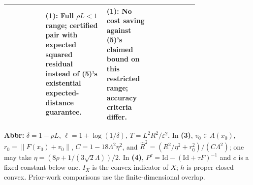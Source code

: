\begin{table}[tp]
\begin{threeparttable}
\begin{tabularx}{\linewidth}{@{}>{\raggedright\arraybackslash}p{0.20\linewidth}>{\raggedright\arraybackslash}p{0.32\linewidth}>{\raggedright\arraybackslash}p{0.25\linewidth}>{\raggedright\arraybackslash}X@{}}
& \textbf{(1)}: Full $\rho L<1$ range; certified pair with expected squared residual instead of \textbf{(5)}'s existential expected-distance guarantee.
& \textbf{(1)}: No cost saving against \textbf{(5)}'s claimed bound on this restricted range; accuracy criteria differ. \\
\bottomrule
\end{tabularx}
\begin{tablenotes}[flushleft]\footnotesize
\item[] \textbf{Abbr:} $\delta=1-\rho L$, $\ell=1+\log(1/\delta)$, $T=L^2R^2/\varepsilon^2$. In \textbf{(3)}, $v_0\in A(x_0)$, $r_0=\|F(x_0)+v_0\|$, $C=1-18\Lambda^2\eta^2$, and $\widehat R^2=(R^2/\eta^2+r_0^2)/(C\Lambda^2)$; one may take $\eta=(8\rho+1/(3\sqrt2\Lambda))/2$. In \textbf{(4)}, $P^\tau=\mathrm{Id}-(\mathrm{Id}+\tau F)^{-1}$ and $c$ is a fixed constant below one. $I_X$ is the convex indicator of $X$; $h$ is proper closed convex. Prior-work comparisons use the finite-dimensional overlap.
\end{tablenotes}
\end{threeparttable}
\end{table}
